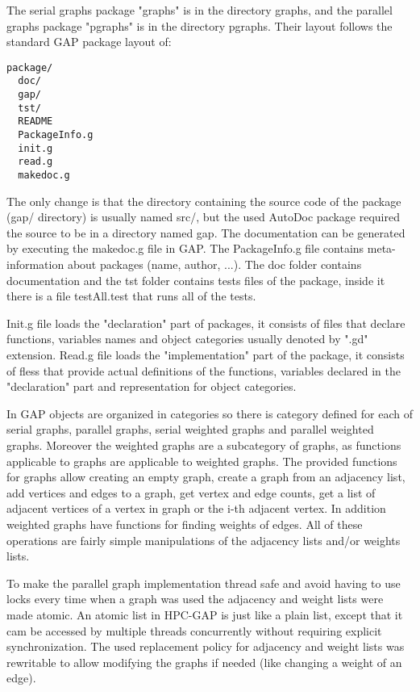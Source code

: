 \documentclass{report}
\theoremstyle{plain}
\theoremstyle{definition}
\theoremstyle{remark}
\begin{document}
The serial graphs package "graphs" is in the directory graphs, and the parallel graphs package "pgraphs" is in the directory pgraphs. Their layout follows the standard GAP package layout of:

\begin{lstlisting}
package/
  doc/
  gap/
  tst/
  README
  PackageInfo.g
  init.g
  read.g
  makedoc.g
\end{lstlisting}

The only change is that the directory containing the source code of the package (gap/ directory) is usually named src/, but the used AutoDoc package required the source to be in a directory named gap. The documentation can be generated by executing the makedoc.g file in GAP.
The PackageInfo.g file contains meta-information about packages (name, author, ...). The doc folder contains documentation and the tst folder contains tests files of the package, inside it there is a file testAll.test that runs all of the tests.

Init.g file loads the "declaration" part of packages, it consists of files that declare functions, variables names and object categories usually denoted by ".gd" extension. Read.g file loads the "implementation" part of the package, it consists of fless that provide actual definitions of the functions, variables declared in the "declaration" part and representation for object categories.

In GAP objects are organized in categories so there is category defined for each of serial graphs, parallel graphs, serial weighted graphs and parallel weighted graphs. Moreover the weighted graphs are a subcategory of graphs, as functions applicable to graphs are applicable to weighted graphs. The provided functions for graphs allow creating an empty graph, create a graph from an adjacency list, add vertices and edges to a graph, get vertex and edge counts, get a list of adjacent vertices of a vertex in graph or the i-th adjacent vertex. In addition weighted graphs have functions for finding weights of edges. All of these operations are fairly simple manipulations of the adjacency lists and/or weights lists.

To make the parallel graph implementation thread safe and avoid having to use locks every time when a graph was used the adjacency and weight lists were made atomic. An atomic list in HPC-GAP is just like a plain list, except that it cam be accessed by multiple threads concurrently without requiring explicit synchronization. The used replacement policy for adjacency and weight lists was rewritable to allow modifying the graphs if needed (like changing a weight of an edge).
\end{document}
